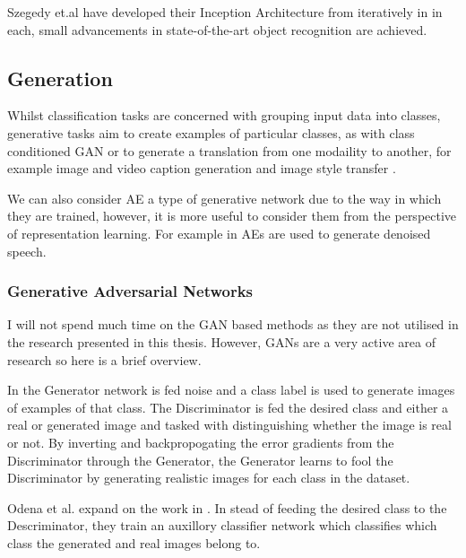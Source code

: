Szegedy et.al have developed their Inception Architecture from \cite{szegedy2015going} iteratively in \cite{szegedy2016rethinking, szegedy2017inception} in each, small advancements in state-of-the-art object recognition are achieved.


\subsection{Generation}
Whilst classification tasks are concerned with grouping input data into classes, generative tasks aim to create examples of particular classes, as with class conditioned \ac{GAN} \cite{mirza2014conditional, odena2017conditional} or to generate a translation from one modaility to another, for example image and video caption generation \cite{vinyals2015show, lebret2015phrase, donahue2015long, jia2015guiding, rohrbach2014coherent, rohrbach2013translating, yao2015describing, yao2015video, venugopalan2014translating, johnson2016densecap, ordonez2011im2text} and image style transfer \cite{zhu2017unpaired}.

We can also consider \ac{AE} a type of generative network due to the way in which they are trained, however, it is more useful to consider them from the perspective of representation learning. For example in \cite{lu2013speech} \ac{AE}s are used to generate denoised speech.

\subsubsection{Generative Adversarial Networks}
I will not spend much time on the \ac{GAN} based methods as they are not utilised in the research presented in this thesis. However, \ac{GAN}s are a very active area of research so here is a brief overview. 

In \cite{mirza2014conditional} the Generator network is fed noise and a class label is used to generate images of examples of that class. The Discriminator is fed the desired class and either a real or generated image and tasked with distinguishing whether the image is real or not. By inverting and backpropogating the error gradients from the Discriminator through the Generator, the Generator learns to fool the Discriminator by generating realistic images for each class in the dataset.

Odena et al. \cite{odena2017conditional} expand on the work in \cite{mirza2014conditional}. In stead of feeding the desired class to the Descriminator, they train an auxillory classifier network which classifies which class the generated and real images belong to.

